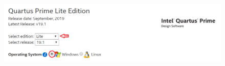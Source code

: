 \documentclass[12pt,singleside,a4paper]{article}
\begin{document}
\begin{figure}[H]
\centering
\includegraphics[width=14cm,height=104cm,keepaspectratio]{InstallationImages/Version.png}
\end{figure}
\end{document}
